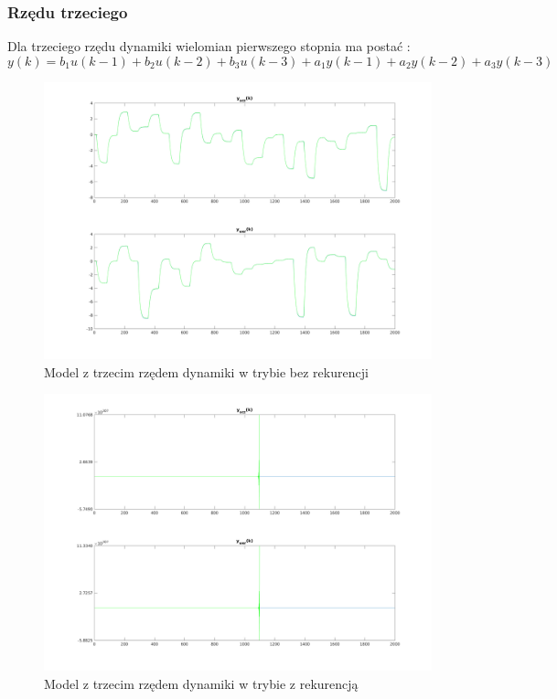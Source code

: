 \documentclass[a4paper, 11pt]{article}
\begin{document}
\subsubsection{Rzędu trzeciego}
Dla trzeciego rzędu dynamiki wielomian pierwszego stopnia ma postać : 
$$y(k) = b_1u(k-1)+b_2u(k-2)+b_3u(k-3) + a_1y(k-1)+a_2y(k-2)+a_3y(k-3)$$
\begin{figure}[H]
\centering
\includegraphics[scale=0.50]{dane_dyn_mod_brek_D_3.png}
\caption{Model z trzecim rzędem dynamiki w trybie bez rekurencji }
\label{}
\end{figure}
\begin{figure}[H]
\centering
\includegraphics[scale=0.50]{dane_dyn_mod_rek_D_3.png}
\caption{Model z trzecim rzędem dynamiki w trybie z rekurencją }
\label{}
\end{figure}
\end{document}
